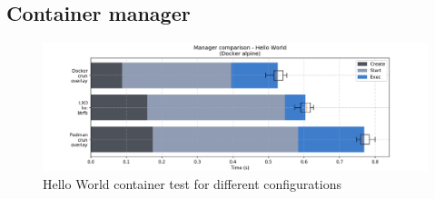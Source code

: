 \clearpage
\subsection{Container manager}

\begin{figure}[h!]
  \begin{center}
    \includegraphics[width=\linewidth]{images/manager/manager-Hello-World-alpine.png}
    \caption{Hello World container test for different configurations}
    \label{fig:manager:hello-world}
  \end{center}
\end{figure}

